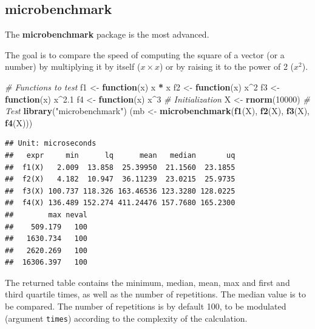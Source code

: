 \documentclass[
  12pt,
  american,
  a4paper,
  extrafontsizes,onecolumn,openright
  ]{memoir}
\newenvironment{Shaded}{\begin{snugshade}}{\end{snugshade}}
\newcommand{\CommentTok}[1]{\textcolor[rgb]{0.56,0.35,0.01}{\textit{#1}}}
\newcommand{\ControlFlowTok}[1]{\textcolor[rgb]{0.13,0.29,0.53}{\textbf{#1}}}
\newcommand{\DecValTok}[1]{\textcolor[rgb]{0.00,0.00,0.81}{#1}}
\newcommand{\FloatTok}[1]{\textcolor[rgb]{0.00,0.00,0.81}{#1}}
\newcommand{\FunctionTok}[1]{\textcolor[rgb]{0.13,0.29,0.53}{\textbf{#1}}}
\newcommand{\NormalTok}[1]{#1}
\newcommand{\OtherTok}[1]{\textcolor[rgb]{0.56,0.35,0.01}{#1}}
\newcommand{\SpecialCharTok}[1]{\textcolor[rgb]{0.81,0.36,0.00}{\textbf{#1}}}
\newcommand{\StringTok}[1]{\textcolor[rgb]{0.31,0.60,0.02}{#1}}
\begin{document}
\normalsize

\subsection{microbenchmark}\label{microbenchmark}

The \textbf{microbenchmark} package is the most advanced.

The goal is to compare the speed of computing the square of a vector (or a number) by multiplying it by itself (\(x \times x\)) or by raising it to the power of 2 (\(x^2\)).

\scriptsize

\begin{Shaded}
\begin{Highlighting}[]
\CommentTok{\# Functions to test}
\NormalTok{f1 }\OtherTok{\textless{}{-}} \ControlFlowTok{function}\NormalTok{(x) x }\SpecialCharTok{*}\NormalTok{ x}
\NormalTok{f2 }\OtherTok{\textless{}{-}} \ControlFlowTok{function}\NormalTok{(x) x}\SpecialCharTok{\^{}}\DecValTok{2}
\NormalTok{f3 }\OtherTok{\textless{}{-}} \ControlFlowTok{function}\NormalTok{(x) x}\SpecialCharTok{\^{}}\FloatTok{2.1}
\NormalTok{f4 }\OtherTok{\textless{}{-}} \ControlFlowTok{function}\NormalTok{(x) x}\SpecialCharTok{\^{}}\DecValTok{3}
\CommentTok{\# Initialization}
\NormalTok{X }\OtherTok{\textless{}{-}} \FunctionTok{rnorm}\NormalTok{(}\DecValTok{10000}\NormalTok{)}
\CommentTok{\# Test}
\FunctionTok{library}\NormalTok{(}\StringTok{"microbenchmark"}\NormalTok{)}
\NormalTok{(mb }\OtherTok{\textless{}{-}} \FunctionTok{microbenchmark}\NormalTok{(}\FunctionTok{f1}\NormalTok{(X), }\FunctionTok{f2}\NormalTok{(X), }\FunctionTok{f3}\NormalTok{(X), }\FunctionTok{f4}\NormalTok{(X)))}
\end{Highlighting}
\end{Shaded}

\begin{verbatim}
## Unit: microseconds
##   expr     min      lq      mean   median       uq
##  f1(X)   2.009  13.858  25.39950  21.1560  23.1855
##  f2(X)   4.182  10.947  36.11239  23.0215  25.9735
##  f3(X) 100.737 118.326 163.46536 123.3280 128.0225
##  f4(X) 136.489 152.274 411.24476 157.7680 165.2300
##        max neval
##    509.179   100
##   1630.734   100
##   2620.269   100
##  16306.397   100
\end{verbatim}

\normalsize

The returned table contains the minimum, median, mean, max and first and third quartile times, as well as the number of repetitions.
The median value is to be compared.
The number of repetitions is by default 100, to be modulated (argument \texttt{times}) according to the complexity of the calculation.
\end{document}

